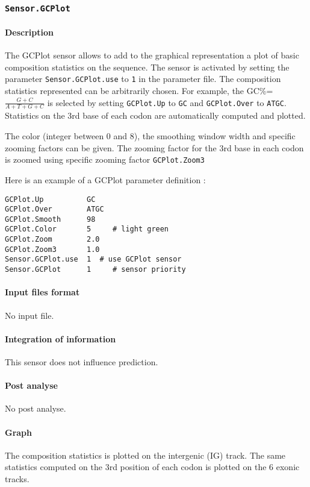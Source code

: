 
\subsubsection{\texttt{Sensor.GCPlot}}

\paragraph{Description}

The GCPlot sensor allows to add to the graphical representation a plot
of basic composition statistics on the sequence. The sensor is
activated by setting the parameter \texttt{Sensor.GCPlot.use} to
\texttt{1} in the parameter file. The composition statistics
represented can be arbitrarily chosen. For example, the
GC\%=$\frac{G+C}{A+T+G+C}$ is selected by setting \texttt{GCPlot.Up}
to \texttt{GC} and \texttt{GCPlot.Over} to \texttt{ATGC}. Statistics
on the 3rd base of each codon are automatically computed and plotted.

The color (integer between 0 and 8), the smoothing window width and
specific zooming factors can be given. The zooming factor for the 3rd base
in each codon is zoomed using specific zooming factor
\texttt{GCPlot.Zoom3}

Here is an example of a GCPlot parameter definition :
\begin{Verbatim}[fontsize=\small]
GCPlot.Up          GC
GCPlot.Over        ATGC
GCPlot.Smooth      98
GCPlot.Color       5     # light green
GCPlot.Zoom        2.0
GCPlot.Zoom3       1.0
Sensor.GCPlot.use  1  # use GCPlot sensor
Sensor.GCPlot      1     # sensor priority
\end{Verbatim}

\paragraph{Input files format}

No input file.

\paragraph{Integration of information}

This sensor does not influence prediction.

\paragraph{Post analyse}

No post analyse.

\paragraph{Graph}

The composition statistics is plotted on the intergenic (IG) track.
The same statistics computed on the 3rd position of each codon is
plotted on the 6 exonic tracks.

